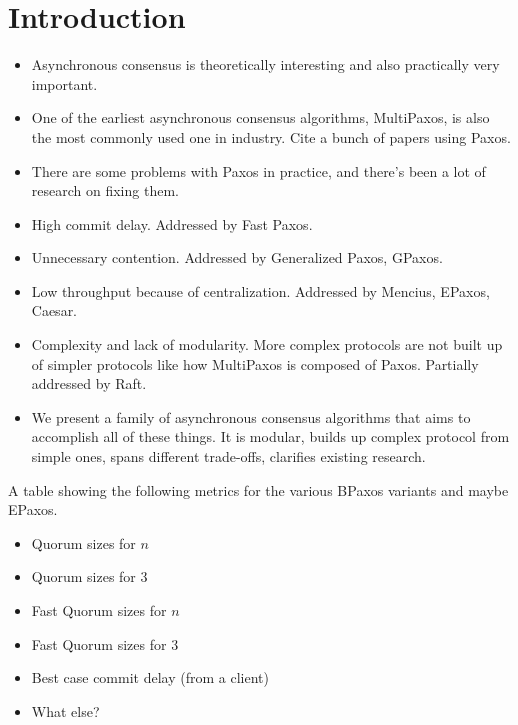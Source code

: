 \section{Introduction}



\begin{itemize}
  \item
    Asynchronous consensus is theoretically interesting and also practically
    very important.

  \item
    One of the earliest asynchronous consensus algorithms, MultiPaxos, is also
    the most commonly used one in industry. Cite a bunch of papers using Paxos.

  \item
    There are some problems with Paxos in practice, and there's been a lot of
    research on fixing them.

  \item
    High commit delay. Addressed by Fast Paxos.

  \item
    Unnecessary contention. Addressed by Generalized Paxos, GPaxos.

  \item
    Low throughput because of centralization. Addressed by Mencius, EPaxos,
    Caesar.

  \item
    Complexity and lack of modularity. More complex protocols are not built up
    of simpler protocols like how MultiPaxos is composed of Paxos. Partially
    addressed by Raft.

  \item
    We present a family of asynchronous consensus algorithms that aims to
    accomplish all of these things. It is modular, builds up complex protocol
    from simple ones, spans different trade-offs, clarifies existing research.
\end{itemize}

A table showing the following metrics for the various BPaxos variants and maybe
EPaxos.
\begin{itemize}
  \item Quorum sizes for $n$
  \item Quorum sizes for $3$
  \item Fast Quorum sizes for $n$
  \item Fast Quorum sizes for $3$
  \item Best case commit delay (from a client)
  \item What else?
\end{itemize}
